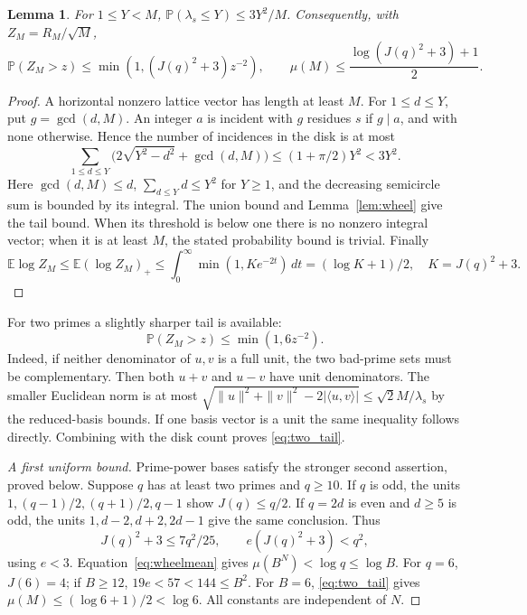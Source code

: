 \documentclass[11pt]{article}
\newtheorem{lemma}[theorem]{Lemma}
\theoremstyle{definition}\newtheorem{definition}[theorem]{Definition}
\theoremstyle{remark}\newtheorem{remark}[theorem]{Remark}
\newcommand{\E}{\mathbb E}
\newcommand{\Prb}{\mathbb P}
\begin{document}
\begin{lemma}\label{lem:shorttail}
For \(1\le Y<M\),
\(\Prb(\lambda_s\le Y)\le3Y^2/M\).
Consequently, with \(Z_M=R_M/\sqrt M\),
\[
 \Prb(Z_M>z)\le\min(1,(J(q)^2+3)z^{-2}),\qquad
 \mu(M)\le \frac{\log(J(q)^2+3)+1}{2}.                 \tag{2.1}\label{eq:wheelmean}
\]
\end{lemma}
\begin{proof}
A horizontal nonzero lattice vector has length at least \(M\).
For \(1\le d\le Y\), put \(g=\gcd(d,M)\).
An integer \(a\) is incident with \(g\) residues \(s\) if \(g\mid a\),
and with none otherwise. Hence the number of incidences in the disk is
at most
\[
 \sum_{1\le d\le Y}\bigl(2\sqrt{Y^2-d^2}+\gcd(d,M)\bigr)
 \le (1+\pi/2)Y^2<3Y^2.
\]
Here \(\gcd(d,M)\le d\), \(\sum_{d\le Y}d\le Y^2\) for \(Y\ge1\),
and the decreasing semicircle sum is bounded by its integral.
The union bound and Lemma~\ref{lem:wheel} give the tail bound.
When its threshold is below one there is no nonzero integral vector;
when it is at least \(M\), the stated probability bound is trivial.
Finally
\[
 \E\log Z_M\le \E(\log Z_M)_+
 \le\int_0^\infty\min(1,Ke^{-2t})\,dt
       =(\log K+1)/2,\quad K=J(q)^2+3.
\]
\end{proof}

For two primes a slightly sharper tail is available:
\[
 \Prb(Z_M>z)\le\min(1,6z^{-2}).                       \tag{2.2}\label{eq:two_tail}
\]
Indeed, if neither denominator of \(u,v\) is a full unit, the two bad-prime
sets must be complementary. Then both \(u+v\) and \(u-v\) have unit
denominators. The smaller Euclidean norm is at most
\(\sqrt{\|u\|^2+\|v\|^2-2|\langle u,v\rangle|}\le\sqrt2 M/\lambda_s\)
by the reduced-basis bounds. If one basis vector is a unit the same
inequality follows directly. Combining with the disk count proves
\eqref{eq:two_tail}.

\begin{proof}[A first uniform bound]
Prime-power bases satisfy the stronger second assertion, proved below.
Suppose \(q\) has at least two primes and \(q\ge10\). If \(q\) is odd,
the units \(1,(q-1)/2,(q+1)/2,q-1\) show \(J(q)\le q/2\).
If \(q=2d\) is even and \(d\ge5\) is odd, the units
\(1,d-2,d+2,2d-1\) give the same conclusion. Thus
\[
 J(q)^2+3\le 7q^2/25,\qquad e(J(q)^2+3)<q^2,
\]
using \(e<3\). Equation~\eqref{eq:wheelmean} gives
\(\mu(B^N)<\log q\le\log B\).
For \(q=6\), \(J(6)=4\); if \(B\ge12\), \(19e<57<144\le B^2\).
For \(B=6\), \eqref{eq:two_tail} gives
\(\mu(M)\le(\log6+1)/2<\log6\).
All constants are independent of \(N\).
\end{proof}
\end{document}
